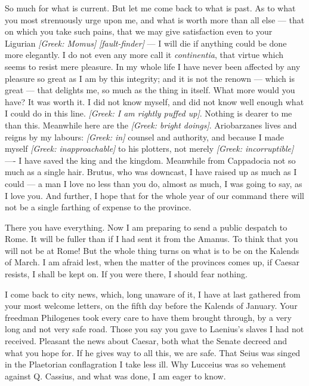  So much for what is current. But let me come back to what is past. As to what you most strenuously urge upon me, and what is worth more than all else --- that on which you take such pains, that we may give satisfaction even to your Ligurian \textit{[Greek: Momus]} \textit{[fault-finder]} --- I will die if anything could be done more elegantly. I do not even any more call it \textit{continentia}, that virtue which seems to resist mere pleasure. In my whole life I have never been affected by any pleasure so great as I am by this integrity; and it is not the renown --- which is great --- that delights me, so much as the thing in itself. What more would you have? It was worth it. I did not know myself, and did not know well enough what I could do in this line. \textit{[Greek: I am rightly puffed up]}. Nothing is dearer to me than this. Meanwhile here are the \textit{[Greek: bright doings]}. Ariobarzanes lives and reigns by my labours: \textit{[Greek: in]} counsel and authority, and because I made myself \textit{[Greek: inapproachable]} to his plotters, not merely \textit{[Greek: incorruptible]} ---- I have saved the king and the kingdom. Meanwhile from Cappadocia not so much as a single hair. Brutus, who was downcast, I have raised up as much as I could --- a man I love no less than you do, almost as much, I was going to say, as I love you. And further, I hope that for the whole year of our command there will not be a single farthing of expense to the province.

 There you have everything. Now I am preparing to send a public despatch to Rome. It will be fuller than if I had sent it from the Amanus. To think that you will not be at Rome! But the whole thing turns on what is to be on the Kalends of March. I am afraid lest, when the matter of the provinces comes up, if Caesar resists, I shall be kept on. If you were there, I should fear nothing.

 I come back to city news, which, long unaware of it, I have at last gathered from your most welcome letters, on the fifth day before the Kalends of January. Your freedman Philogenes took every care to have them brought through, by a very long and not very safe road. Those you say you gave to Laenius's slaves I had not received. Pleasant the news about Caesar, both what the Senate decreed and what you hope for. If he gives way to all this, we are safe. That Seius was singed in the Plaetorian conflagration I take less ill. Why Lucceius was so vehement against Q. Cassius, and what was done, I am eager to know.

